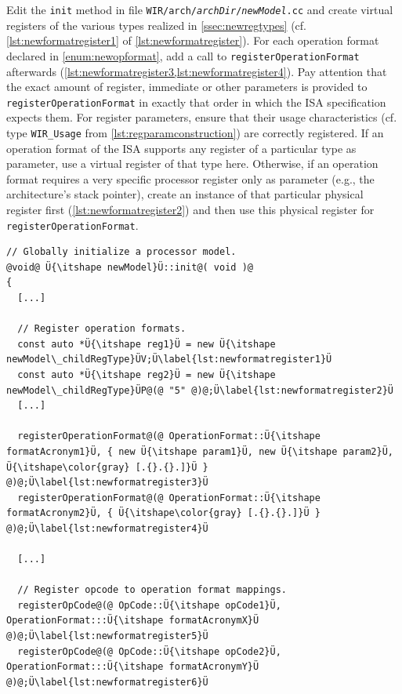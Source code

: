\begin{enumerate}[resume]
  Edit the \texttt{init} method in file \texttt{WIR/arch/{\itshape archDir}/{\itshape newModel}.cc} and create virtual registers of the various types realized in \cref{ssec:newregtypes} (cf. \cref{lst:newformatregister1} of \cref{lst:newformatregister}).
  For each operation format declared in \cref{enum:newopformat}, add a call to \texttt{register\-OperationFormat} afterwards (\cref{lst:newformatregister3,lst:newformatregister4}).
  Pay attention that the exact amount of register, immediate or other parameters is provided to \texttt{registerOperationFormat} in exactly that order in which the \gls{ISA} specification expects them.
  For register parameters, ensure that their usage characteristics (cf. type \texttt{WIR\_Usage} from \cref{lst:regparamconstruction}) are correctly registered.
  If an operation format of the \gls{ISA} supports any register of a particular type as parameter, use a virtual register of that type here.
  Otherwise, if an operation format requires a very specific processor register only as parameter (e.g., the architecture's stack pointer), create an instance of that particular physical register first (\cref{lst:newformatregister2}) and then use this physical register for \texttt{registerOperationFormat}.

\begin{lstlisting}[style=code,float=t,caption={Operation Format Registration in a New Processor Model's \texttt{init} Method},label=lst:newformatregister]
// Globally initialize a processor model.
@void@ Ü{\itshape newModel}Ü::init@( void )@
{
  [...]

  // Register operation formats.
  const auto *Ü{\itshape reg1}Ü = new Ü{\itshape newModel\_childRegType}ÜV;Ü\label{lst:newformatregister1}Ü
  const auto *Ü{\itshape reg2}Ü = new Ü{\itshape newModel\_childRegType}ÜP@(@ "5" @)@;Ü\label{lst:newformatregister2}Ü
  [...]

  registerOperationFormat@(@ OperationFormat::Ü{\itshape formatAcronym1}Ü, { new Ü{\itshape param1}Ü, new Ü{\itshape param2}Ü, Ü{\itshape\color{gray} [.{}.{}.]}Ü } @)@;Ü\label{lst:newformatregister3}Ü
  registerOperationFormat@(@ OperationFormat::Ü{\itshape formatAcronym2}Ü, { Ü{\itshape\color{gray} [.{}.{}.]}Ü } @)@;Ü\label{lst:newformatregister4}Ü

  [...]

  // Register opcode to operation format mappings.
  registerOpCode@(@ OpCode::Ü{\itshape opCode1}Ü, OperationFormat:::Ü{\itshape formatAcronymX}Ü @)@;Ü\label{lst:newformatregister5}Ü
  registerOpCode@(@ OpCode::Ü{\itshape opCode2}Ü, OperationFormat:::Ü{\itshape formatAcronymY}Ü @)@;Ü\label{lst:newformatregister6}Ü


\end{lstlisting}
\end{enumerate}
